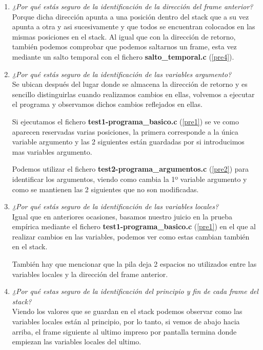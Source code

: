 \documentclass[12pt,a4paper,titlepage]{article}
\begin{document}
\begin{enumerate}
  \item \textit{¿Por qué estás seguro de la identificación de la dirección del frame
anterior?}
  \\
Porque dicha dirección apunta a una posición dentro del stack que a su vez apunta a otra y
asi sucesivamente y que todos se encuentran colocados en las mismas posiciones en el
stack.
Al igual que con la dirección de retorno, también podemos comprobar que podemos saltarnos
un frame, esta vez mediante un salto temporal con el fichero \textbf{salto\_temporal.c}
(\ref{pre4}).


  \item \textit{¿Por qué estás seguro de la identificación de las variables argumento?}
  \\
Se ubican después del lugar donde se almacena la dirección de retorno y es sencillo
distinguirlas cuando realizamos cambios en ellas, volvemos a ejecutar el programa y
observamos dichos cambios reflejados en ellas.

Si ejecutamos el fichero \textbf{test1-programa\_basico.c} (\ref{pre1}) se ve como
aparecen reservadas varias posiciones, la primera corresponde a la única variable
argumento y las 2 siguientes están guardadas por si introducimos mas variables argumento.

Podemos utilizar el fichero \textbf{test2-programa\_argumentos.c} (\ref{pre2}) para
identificar los argumentos, viendo como cambia la 1º variable argumento y como se
mantienen las 2 siguientes que no son modificadas.


  \item \textit{¿Por qué estás seguro de la identificación de las variables locales?}
  \\
Igual que en anteriores ocasiones, basamos nuestro juicio en la prueba empírica mediante
el fichero \textbf{test1-programa\_basico.c} (\ref{pre1}) en el que al realizar cambios en
las variables, podemos ver como estas cambian también en el stack.

También hay que mencionar que la pila deja 2 espacios no utilizados entre las variables
locales y la dirección del frame anterior.

  \item \textit{¿Por qué estas seguro de la identificación del principio y fin de cada
frame del stack?}
  \\
Viendo los valores que se guardan en el stack podemos observar como las variables locales
están al principio, por lo tanto, si vemos de abajo hacia arriba, el frame siguiente al
ultimo impreso por pantalla termina donde empiezan las variables locales del ultimo.



\end{enumerate}
\end{document}
